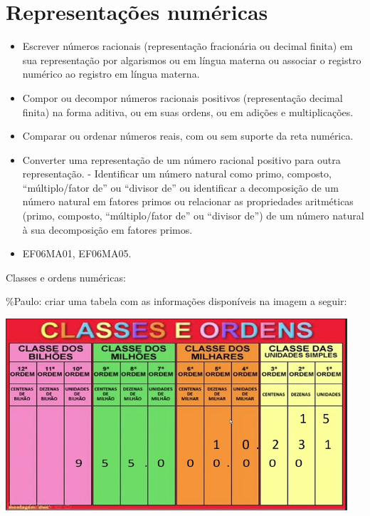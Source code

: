 \chapter{Representações numéricas}


\begin{itemize}
\item
  Escrever números racionais (representação fracionária ou decimal
  finita) em sua representação por algarismos ou em língua materna ou
  associar o registro numérico ao registro em língua materna.
\item
  Compor ou decompor números racionais positivos (representação decimal
  finita) na forma aditiva, ou em suas ordens, ou em adições e
  multiplicações.
\item
  Comparar ou ordenar números reais, com ou sem suporte da reta
  numérica.
\item
  Converter uma representação de um número racional positivo para outra
  representação. - Identificar um número natural como primo, composto,
  ``múltiplo/fator de'' ou ``divisor de'' ou identificar a decomposição
  de um número natural em fatores primos ou relacionar as propriedades
  aritméticas (primo, composto, ``múltiplo/fator de'' ou ``divisor de'')
  de um número natural à sua decomposição em fatores primos.
\end{itemize}


\begin{itemize} 
\item  EF06MA01, EF06MA05.
\end{itemize}

Classes e ordens numéricas:

\%Paulo: criar uma tabela com as informações disponíveis na imagem a
seguir:

\includegraphics[width=5in,height=2.80208in]{./imgSAEB_6_MAT/media/image1.png}

